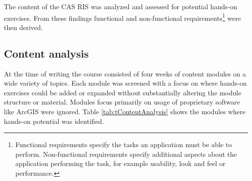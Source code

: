 \documentclass[11pt, a4paper, oneside, parskip=full-]{scrartcl}
\begin{document}
The content of the CAS RIS was analyzed and assessed for potential hands-on
exercises. From these findings functional and non-functional
requirements\footnote{Functional requirements specify the tasks an application
must be able to perform. Non-functional requirements specify additional aspects
about the application performing the task, for example usability, look and feel
or performance. } were then derived.

\subsection{Content analysis}
At the time of writing the course consisted of four weeks of content modules on
a wide variety of topics. Each module was screened with a focus on where
hands-on exercises could be added or expanded without substantially altering the
module structure or material. Modules focus primarily on usage of proprietary
software like ArcGIS were ignored. Table \ref{tab:tContentAnalysis} shows the
modules where hands-on potential was identified.
\end{document}
